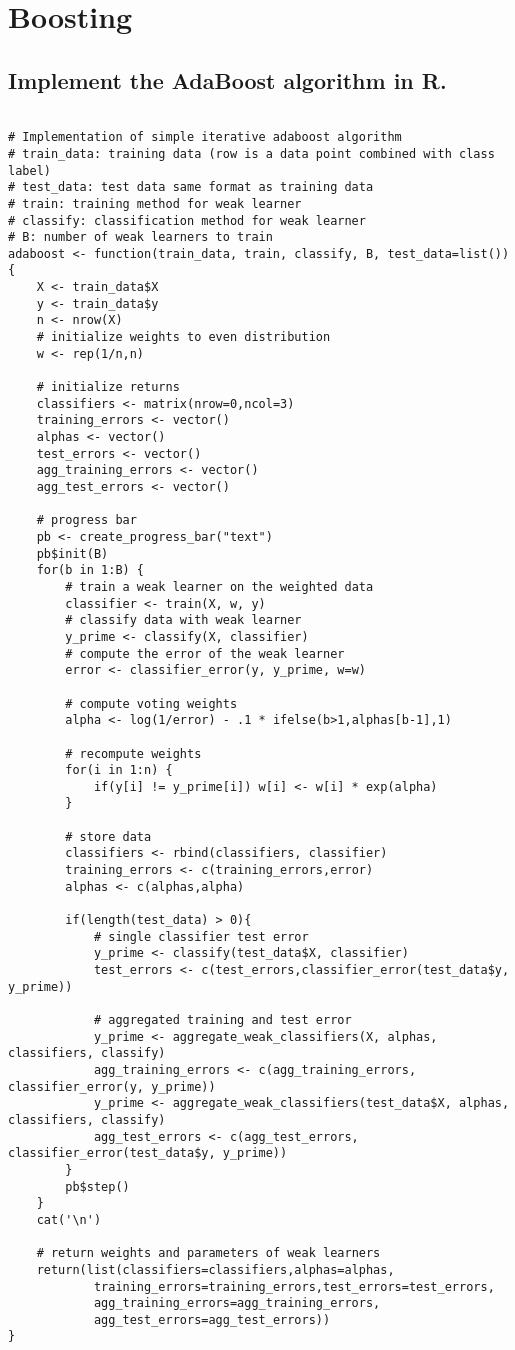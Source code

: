 \documentclass[11pt]{article}
\theoremstyle{quest}
\newcommand{\problem}[1]{\section{#1}}        %
\newcommand{\subproblem}[1]{\subsection{#1}}      %
\begin{document}
\vspace{1em}
\problem{Boosting}

\subproblem{Implement the AdaBoost algorithm in R.}
\begin{adjustwidth}{3.5em}{0em}  
\begin{lstlisting}

# Implementation of simple iterative adaboost algorithm
# train_data: training data (row is a data point combined with class label)
# test_data: test data same format as training data
# train: training method for weak learner
# classify: classification method for weak learner
# B: number of weak learners to train
adaboost <- function(train_data, train, classify, B, test_data=list()) {
    X <- train_data$X
    y <- train_data$y
    n <- nrow(X)
    # initialize weights to even distribution
    w <- rep(1/n,n)

    # initialize returns
    classifiers <- matrix(nrow=0,ncol=3)
    training_errors <- vector()
    alphas <- vector()
    test_errors <- vector()
    agg_training_errors <- vector()
    agg_test_errors <- vector()

    # progress bar
    pb <- create_progress_bar("text")
    pb$init(B)
    for(b in 1:B) {
        # train a weak learner on the weighted data
        classifier <- train(X, w, y)
        # classify data with weak learner
        y_prime <- classify(X, classifier)
        # compute the error of the weak learner
        error <- classifier_error(y, y_prime, w=w)

        # compute voting weights
        alpha <- log(1/error) - .1 * ifelse(b>1,alphas[b-1],1)

        # recompute weights
        for(i in 1:n) {
            if(y[i] != y_prime[i]) w[i] <- w[i] * exp(alpha)
        }

        # store data
        classifiers <- rbind(classifiers, classifier)
        training_errors <- c(training_errors,error)
        alphas <- c(alphas,alpha)

        if(length(test_data) > 0){
            # single classifier test error
            y_prime <- classify(test_data$X, classifier)
            test_errors <- c(test_errors,classifier_error(test_data$y, y_prime))
            
            # aggregated training and test error
            y_prime <- aggregate_weak_classifiers(X, alphas, classifiers, classify)
            agg_training_errors <- c(agg_training_errors, classifier_error(y, y_prime))
            y_prime <- aggregate_weak_classifiers(test_data$X, alphas, classifiers, classify)
            agg_test_errors <- c(agg_test_errors, classifier_error(test_data$y, y_prime))
        }
        pb$step()
    }
    cat('\n')

    # return weights and parameters of weak learners
    return(list(classifiers=classifiers,alphas=alphas,
            training_errors=training_errors,test_errors=test_errors,
            agg_training_errors=agg_training_errors,
            agg_test_errors=agg_test_errors))
}

\end{lstlisting}
\end{adjustwidth}
\end{document}
